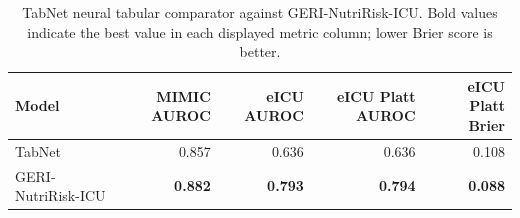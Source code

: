 \documentclass[utf8]{frontiers_suppmat}
\begin{document}
\begin{table}[!htbp]
\centering
\caption{Bounded SOTA completion and GERI-NutriRisk-ICU model-lock benchmark. Bold values indicate the best value in each displayed metric column; lower Brier score is better.}
\label{tab:sota_lock_s8}
\noindent{}
\end{table}

\begin{table}[!htbp]
\centering
\caption{TabNet neural tabular comparator against GERI-NutriRisk-ICU. Bold values indicate the best value in each displayed metric column; lower Brier score is better.}
\label{tab:tabnet_s9}
\small
\begin{tabular}{lrrrr}
\toprule
Model & MIMIC AUROC & eICU AUROC & eICU Platt AUROC & eICU Platt Brier\\
\midrule
TabNet & 0.857 & 0.636 & 0.636 & 0.108\\
GERI-NutriRisk-ICU & \textbf{0.882} & \textbf{0.793} & \textbf{0.794} & \textbf{0.088}\\
\bottomrule
\end{tabular}
\end{table}
\end{document}
